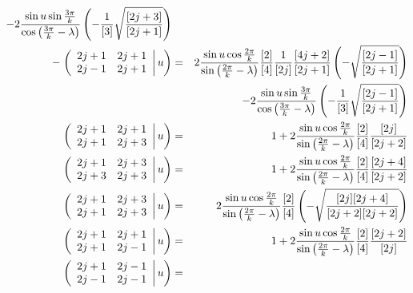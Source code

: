 \documentclass[11pt]{article}
\begin{document}
\begin{eqnarray}
  - 2\frac{\sin u \sin{3\pi \over k}}{\cos\left({3\pi \over k}-\lambda\right)} \left(- \frac{1}{[3]}\sqrt{[2j+3] \over[2j+1]}\right)
     \nonumber \\
    -  \left. \left( \begin{array}{cc} 2 j +1 & 2 j + 1 \\ 2 j -1  & 2 j +1 \end{array} \right| u  \right) &=&  
    2\frac{\sin u \cos{2\pi \over k}}{\sin{\left({2\pi \over k}-\lambda\right)}} \frac{[2]}{[4]}\frac{1}{[2j]}\frac{[4j+2]}{[2j+1]}\left(-\sqrt{[2j-1] \over[2j+1]}\right)   \nonumber \\ & &
  - 2\frac{\sin u \sin{3\pi \over k}}{\cos\left({3\pi \over k}-\lambda\right)} \left(- \frac{1}{[3]}\sqrt{[2j-1] \over[2j+1]}\right)
     \nonumber \\
    \left. \left( \begin{array}{cc} 2 j +1 & 2 j + 1 \\ 2 j +1  & 2 j +3 \end{array} \right| u  \right) &=&  
    1+
    2\frac{\sin u \cos{2\pi \over k}}{\sin{\left({2\pi \over k}-\lambda\right)}} \frac{[2]}{[4]} \frac{[2j]}{[2j+2]}  
         \nonumber \\
    \left. \left( \begin{array}{cc} 2 j +1 & 2 j + 3 \\ 2 j + 3  & 2 j +3 \end{array} \right| u  \right) &=&  
    1+
    2\frac{\sin u \cos{2\pi \over k}}{\sin{\left({2\pi \over k}-\lambda\right)}} \frac{[2]}{[4]} \frac{[2j+4]}{[2j+2]}
             \nonumber \\
    \left. \left( \begin{array}{cc} 2 j +1 & 2 j + 3 \\ 2 j + 1  & 2 j +3 \end{array} \right| u  \right) &=&  
      2\frac{\sin u \cos{2\pi \over k}}{\sin{\left({2\pi \over k}-\lambda\right)}} \frac{[2]}{[4]} \left(-\sqrt{\frac{[2j][2j+4]}{[2j+2][2j+2]}}\right)
    \nonumber \\
    \left. \left( \begin{array}{cc} 2 j +1 & 2 j + 1 \\ 2 j +1  & 2 j -1 \end{array} \right| u  \right) &=&  
    1+
    2\frac{\sin u \cos{2\pi \over k}}{\sin{\left({2\pi \over k}-\lambda\right)}} \frac{[2]}{[4]} \frac{[2j+2]}{[2j]}  
         \nonumber \\
    \left. \left( \begin{array}{cc} 2 j +1 & 2 j -1 \\ 2 j -1  & 2 j -1 \end{array} \right| u  \right) &=&  

\end{eqnarray}
\end{document}
